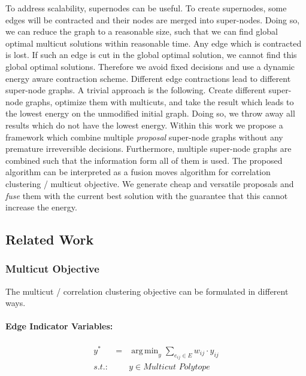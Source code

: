 \documentclass[10pt,twocolumn,letterpaper]{article}
\DeclareMathOperator*{\argmin}{arg\,min}
\begin{document}
To address scalability, supernodes can be useful.
To create supernodes, some edges will be contracted
and their nodes are merged into super-nodes.
Doing so, we can reduce  the graph 
to a reasonable size, such that we can find
global optimal multicut solutions within reasonable time.
%
Any edge which is contracted is lost.
If such an edge is cut in the global optimal solution, we cannot 
find this global optimal solutions.
Therefore we avoid fixed decisions and use a
dynamic energy aware contraction scheme.
%
Different edge contractions lead to different super-node graphs.
A trivial approach is the following.
Create different super-node graphs, optimize them with multicuts,
and take the result which leads to the lowest energy
on the unmodified initial graph.
% 
Doing so, we throw away all results which do not have the lowest energy.
Within this work we propose a framework which 
combine multiple \emph{proposal} super-node graphs
without any premature irreversible decisions.
Furthermore, multiple super-node graphs are combined such
that the information form all of them is used.
%
The proposed algorithm can be interpreted as a fusion moves
algorithm for correlation clustering / multicut objective.
We generate cheap and versatile proposals
and \emph{fuse} them with the current best solution with the
guarantee that this cannot increase the energy.


\subsection{Related Work}


\subsubsection{Multicut Objective}

The multicut / correlation clustering objective 
can be formulated in different ways.



\paragraph{Edge Indicator Variables:}
\begin{center}
    \begin{eqnarray}
        y^* &=& \argmin_{y} \sum_{ e_{ij} \in E } w_{ij} \cdot y_{ij} \\
        s.t.:& & y \in \textit{Multicut Polytope} \nonumber
    \end{eqnarray}
\end{center}
\end{document}
